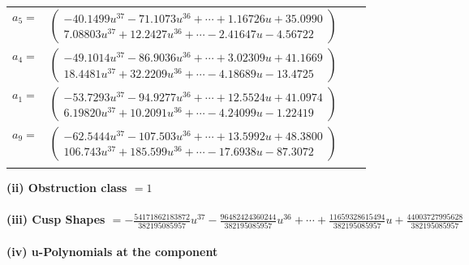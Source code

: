 \documentclass[1p]{elsarticle_modified}
\theoremstyle{definition}
\begin{document}
\begin{tabular}{m{7pt} m{180pt} m{7pt} m{180pt} }
\flushright $a_{5}=$&$\begin{pmatrix}-40.1499 u^{37}-71.1073 u^{36}+\cdots+1.16726 u+35.0990\\7.08803 u^{37}+12.2427 u^{36}+\cdots-2.41647 u-4.56722\end{pmatrix}$ \\
\flushright $a_{4}=$&$\begin{pmatrix}-49.1014 u^{37}-86.9036 u^{36}+\cdots+3.02309 u+41.1669\\18.4481 u^{37}+32.2209 u^{36}+\cdots-4.18689 u-13.4725\end{pmatrix}$ \\
\flushright $a_{1}=$&$\begin{pmatrix}-53.7293 u^{37}-94.9277 u^{36}+\cdots+12.5524 u+41.0974\\6.19820 u^{37}+10.2091 u^{36}+\cdots-4.24099 u-1.22419\end{pmatrix}$ \\
\flushright $a_{9}=$&$\begin{pmatrix}-62.5444 u^{37}-107.503 u^{36}+\cdots+13.5992 u+48.3800\\106.743 u^{37}+185.599 u^{36}+\cdots-17.6938 u-87.3072\end{pmatrix}$\\&\end{tabular}
\flushleft \textbf{(ii) Obstruction class $= 1$}\\~\\
\flushleft \textbf{(iii) Cusp Shapes $= -\frac{54171862183872}{382195085957} u^{37}-\frac{96482424360244}{382195085957} u^{36}+\cdots+\frac{11659328615494}{382195085957} u+\frac{44003727995628}{382195085957}$}\\~\\
\newpage\renewcommand{\arraystretch}{1}
\flushleft \textbf{(iv) u-Polynomials at the component}\newline \\
\end{document}
